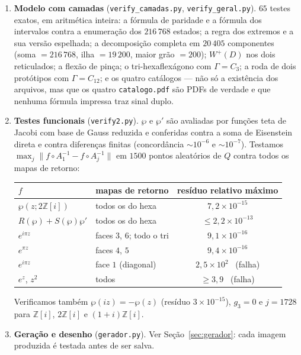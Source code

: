 \documentclass[11pt,a4paper]{article}
\theoremstyle{plain}
\theoremstyle{definition}
\theoremstyle{remark}
\newcommand{\Z}{\mathbb{Z}}
\newcommand{\Zi}{\Z[i]}
\begin{document}
\begin{enumerate}
\item \textbf{Modelo com camadas} (\texttt{verify\_camadas.py},
\texttt{verify\_geral.py}). $65$ testes exatos, em aritmética inteira:
a fórmula de paridade e a fórmula dos intervalos contra a enumeração dos
$216\,768$ estados; a regra dos extremos e a sua versão espelhada; a
decomposição completa em $20\,405$ componentes (soma $=216\,768$, ilha $=19\,200$,
maior grão $=200$); $W^+(D)$ nos dois reticulados; a flexão de pinça; o
tri-hexaflexágono com $\Gamma=C_3$; a roda de dois protótipos com $\Gamma=C_{12}$;
e os quatro catálogos --- não só a existência dos arquivos, mas que os
quatro \texttt{catalogo.pdf} são PDFs de verdade e que nenhuma fórmula
impressa traz sinal duplo.

\item \textbf{Testes funcionais} (\texttt{verify2.py}).
$\wp$ e $\wp'$ são avaliadas por funções teta de Jacobi com base de Gauss
reduzida e conferidas contra a soma de Eisenstein direta e contra diferenças
finitas (concordância $\sim10^{-6}$ e $\sim10^{-7}$). Testamos
$\max_j\|f\circ A_1^{-1}-f\circ A_j^{-1}\|$ em $1500$ pontos aleatórios de $Q$
contra todos os mapas de retorno:
\begin{center}
\renewcommand{\arraystretch}{1.15}
\begin{tabular}{llc}
\toprule
$f$ & mapas de retorno & resíduo relativo máximo\\
\midrule
$\wp(z;2\Zi)$                 & todos os do hexa   & $7{,}2\times10^{-15}$\\
$R(\wp)+S(\wp)\wp'$           & todos os do hexa   & $\le 2{,}2\times10^{-13}$\\
$e^{i\pi z}$                  & faces $3$, $6$; todo o tri & $9{,}1\times10^{-16}$\\
$e^{\pi z}$                   & faces $4$, $5$     & $9{,}4\times10^{-16}$\\
\midrule
$e^{i\pi z}$                  & face $1$ (diagonal) & $2{,}5\times10^{2}$ \ (falha)\\
$e^{z}$, $z^2$                & todos              & $\ge 3{,}9$ \ (falha)\\
\bottomrule
\end{tabular}
\end{center}
Verificamos também $\wp(iz)=-\wp(z)$ (resíduo $3\times10^{-15}$), $g_3=0$ e
$j=1728$ para $\Zi$, $2\Zi$ e $(1+i)\Zi$.

\item \textbf{Geração e desenho} (\texttt{gerador.py}). Ver
Seção~\ref{sec:gerador}: cada imagem produzida é testada antes de ser salva.
\end{enumerate}
\end{document}
